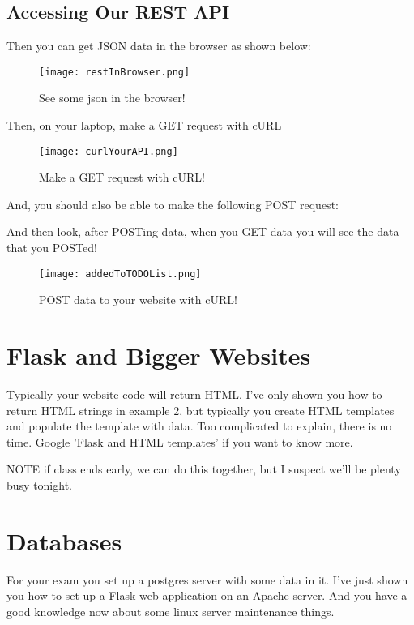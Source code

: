 \documentclass[10pt]{article}
\begin{document}


\subsection{Accessing Our REST API}
Then you can get JSON data in the browser as shown below:

\begin{figure}[h]
  \centering
    \texttt{[image: restInBrowser.png]}
  \caption{See some json in the browser!}
\end{figure}

Then, on your laptop, make a GET request with cURL


\begin{figure}[h]
  \centering
    \texttt{[image: curlYourAPI.png]}
  \caption{Make a GET request with cURL!}
\end{figure}

And, you should also be able to make the following POST request:



And then look, after POSTing data, when you GET data you will see the data that you POSTed!

\begin{figure}[h]
  \centering
    \texttt{[image: addedToTODOList.png]}
  \caption{POST data to your website with cURL!}
\end{figure}

\pagebreak

\section{Flask and Bigger Websites}
Typically your website code will return HTML. I've only shown you how to return HTML strings in example 2, but typically you create HTML templates and populate the template with data. Too complicated to explain, there is no time. Google 'Flask and HTML templates' if you want to know more.

NOTE if class ends early, we can do this together, but I suspect we'll be plenty busy tonight.

\section{Databases}
For your exam you set up a postgres server with some data in it. I've just shown you how to set up a Flask web application on an Apache server. And you have a good knowledge now about some linux server maintenance things. 
\end{document}

